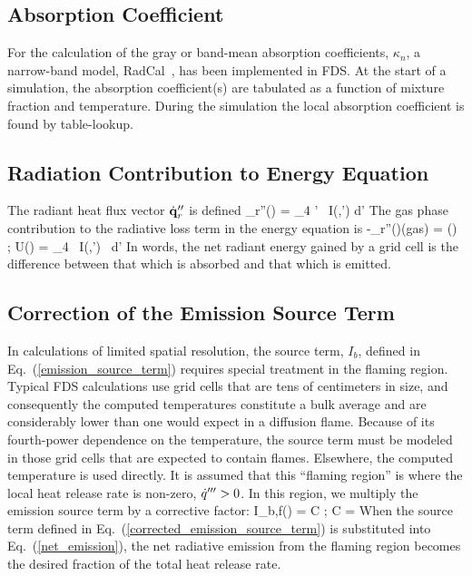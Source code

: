 \subsection{Absorption Coefficient}

For the calculation of the gray or band-mean absorption coefficients,
$\kappa_n$, a narrow-band model, RadCal~\cite{RadCal}, has been
implemented in FDS. At the start of a simulation, the absorption
coefficient(s) are tabulated as a function of mixture fraction and
temperature. During the simulation the local absorption coefficient is
found by table-lookup.


\subsection{Radiation Contribution to Energy Equation}

The radiant heat flux vector $\dot{\bf q}_r''$ is defined
\be \dbq_r''(\bx) = \int_{4\pi} \; \bs' \, I(\bx,\bs') \; d\bs'   \ee
The gas phase contribution to the radiative loss term in the energy equation is
\be -\nabla\!\cdot \dbq_r''(\bx)(\mbox{gas}) =
    \kappa(\bx) \, \left[ U(\bx) - 4 \pi \, I_b(\bx) \right]  \quad ; \quad
    U(\bx) = \int_{4\pi} \, I(\bx,\bs') \, d\bs'  \label{net_emission}
\ee
In words, the net radiant energy gained by a grid cell is the
difference between that which is absorbed and that which is emitted.

\subsection{Correction of the Emission Source Term}

In calculations of limited spatial resolution, the source term, $I_b$,
defined in Eq.~(\ref{emission_source_term}) requires special treatment in the flaming region. Typical FDS calculations
use grid cells that are tens of centimeters in size, and consequently the computed temperatures constitute a bulk average and are considerably lower than
one would expect in a diffusion flame.
Because of its fourth-power dependence on the temperature,
the source term must be modeled in those grid cells that are expected to contain flames. Elsewhere, the computed temperature is used directly.
It is assumed that this ``flaming region'' is where the local heat release rate is non-zero, $\dot{q}'''>0$. In this region, we
multiply the emission source term by a corrective factor:
\be I_{b,f}(\bx) = C    \quad ; \quad
    C =  \label{corrected_emission_source_term}
\ee
When the source term defined in Eq.~(\ref{corrected_emission_source_term}) is
substituted into Eq.~(\ref{net_emission}), the net radiative emission from the flaming region becomes the desired fraction of the total heat release rate.


